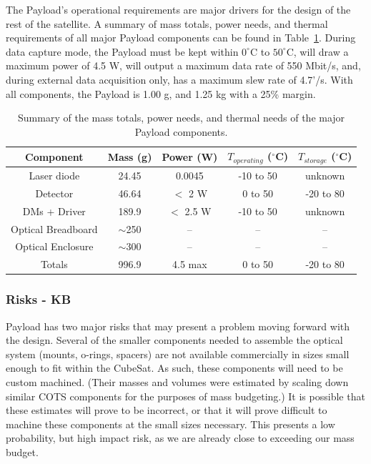 \documentclass[12pt]{article}
\begin{document}
The Payload's operational requirements are major drivers for the design of the rest of the satellite. A summary of mass totals, power needs, and thermal requirements of all major Payload components can be found in Table~\ref{fig:payload_summary_table}.  
During data capture mode, the Payload must be kept within $0^\circ$C to $50^\circ$C, will draw a maximum power of 4.5 W, will output a maximum data rate of 550 Mbit/s, and, during external data acquisition only, has a maximum slew rate of 4.7'/s. 
With all components, the Payload is 1.00 g, and 1.25 kg with a 25\% margin.  

\begin{table}
\caption{Summary of the mass totals, power needs, and thermal needs of the major Payload components.}
\begin{tabular}{|c||c|c|c|c|} \hline
	\textbf{Component} & \textbf{Mass (g)} & \textbf{Power (W)} & \textbf{$T_{operating}$ ($^\circ$C)} & \textbf{$T_{storage}$ ($^\circ$C)} \\ \hline \hline
Laser diode & 24.45 & 0.0045 & -10 to 50 & unknown \\
Detector & 46.64 & $<$ 2 W & 0 to 50 & -20 to 80 \\
DMs + Driver & 189.9 & $<$ 2.5 W & -10 to 50 & unknown \\
Optical Breadboard & $\sim$250 & -- & -- & -- \\
Optical Enclosure & $\sim$300 & -- & -- & -- \\ \hline \hline
Totals & 996.9 & 4.5 max & 0 to 50 & -20 to 80 \\ \hline
\end{tabular}\label{fig:payload_summary_table}
\end{table}

\subsubsection{Risks - KB}
Payload has two major risks that may present a problem moving forward with the design. Several of the smaller components needed to assemble the optical system (mounts, o-rings, spacers) are not available commercially in sizes small enough to fit within the CubeSat. As such, these components will need to be custom machined. (Their masses and volumes were estimated by scaling down similar COTS components for the purposes of mass budgeting.) It is possible that these estimates will prove to be incorrect, or that it will prove difficult to machine these components at the small sizes necessary. This presents a low probability, but high impact risk, as we are already close to exceeding our mass budget. 
\end{document}
